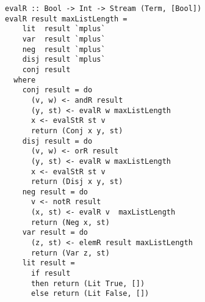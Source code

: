 

\begin{figure*}[!t]
  \centering
  \begin{minipage}{\textwidth}
    \begin{lstlisting}[label={eval_r}, caption={Functional implementation of the direction \lstinline{evalo out out in}}, captionpos=b, frame=tb]
evalR :: Bool -> Int -> Stream (Term, [Bool])
evalR result maxListLength =
    lit  result `mplus`
    var  result `mplus`
    neg  result `mplus`
    disj result `mplus`
    conj result
  where
    conj result = do
      (v, w) <- andR result
      (y, st) <- evalR w maxListLength
      x <- evalStR st v
      return (Conj x y, st)
    disj result = do
      (v, w) <- orR result
      (y, st) <- evalR w maxListLength
      x <- evalStR st v
      return (Disj x y, st)
    neg result = do
      v <- notR result
      (x, st) <- evalR v  maxListLength
      return (Neg x, st)
    var result = do
      (z, st) <- elemR result maxListLength
      return (Var z, st)
    lit result =
      if result
      then return (Lit True, [])
      else return (Lit False, [])
    \end{lstlisting}
  \end{minipage}
\end{figure*}


